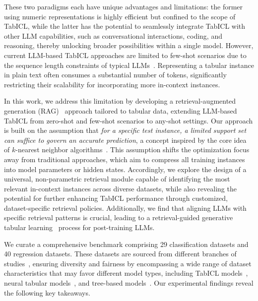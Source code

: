 These two paradigms each have unique advantages and limitations: the former using numeric representations is highly efficient but confined to the scope of TabICL, while the latter has the potential to seamlessly integrate TabICL with other LLM capabilities, such as conversational interactions, coding, and reasoning, thereby unlocking broader possibilities within a single model.
However, current LLM-based TabICL approaches are limited to few-shot scenarios due to the sequence length constraints of typical LLMs~\citep{wen2024GTL,gardner2024TabuLa}.
Representing a tabular instance in plain text often consumes a substantial number of tokens, significantly restricting their scalability for incorporating more in-context instances.

In this work, we address this limitation by developing a retrieval-augmented generation (RAG)~\citep{lewis2020RAG} approach tailored to tabular data, extending LLM-based TabICL from zero-shot and few-shot scenarios to any-shot settings.
Our approach is built on the assumption that \emph{for a specific test instance, a limited support set can suffice to govern an accurate prediction}, a concept inspired by the core idea of $k$-nearest neighbor algorithms~\citep{fix1951knn,cover1967knn_cls}.
This assumption shifts the optimization focus away from traditional approaches, which aim to compress all training instances into model parameters or hidden states.
Accordingly, we explore the design of a universal, non-parametric retrieval module capable of identifying the most relevant in-context instances across diverse datasets, while also revealing the potential for further enhancing TabICL performance through customized, dataset-specific retrieval policies.
Additionally, we find that aligning LLMs with specific retrieval patterns is crucial, leading to a retrieval-guided generative tabular learning~\citep{wen2024GTL} process for post-training LLMs.

We curate a comprehensive benchmark comprising 29 classification datasets and 40 regression datasets.
These datasets are sourced from different branches of studies~\citep{wen2024GTL,gorishniy2021revisit_tab_dnn,grinsztajn2022tree_gt_tab_nn}, ensuring diversity and fairness by encompassing a wide range of dataset characteristics that may favor different model types, including TabICL models~\citep{wen2024GTL,hollmann2023TabPFN,hollmann2025TabPFNv2}, neural tabular models~\citep{gorishniy2021revisit_tab_dnn,gorishniy2024TabR}, and tree-based models~\citep{chen2016XGBoost,ke2017LightGBM,prokhorenkova2018catboost}.
Our experimental findings reveal the following key takeaways.

